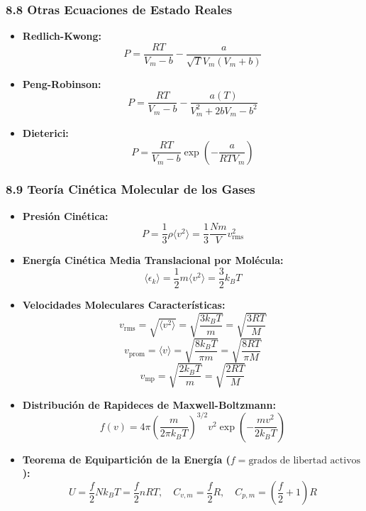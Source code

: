 \documentclass[11pt,a4paper]{article}
\begin{document}
\subsubsection*{8.8 Otras Ecuaciones de Estado Reales}

\begin{itemize}
  \item \textbf{Redlich-Kwong:}
  \[
    P = \frac{R T}{V_m - b} - \frac{a}{\sqrt{T} V_m (V_m + b)}
  \]
  \item \textbf{Peng-Robinson:}
  \[
    P = \frac{R T}{V_m - b} - \frac{a(T)}{V_m^2 + 2bV_m - b^2}
  \]
  \item \textbf{Dieterici:}
  \[
    P = \frac{R T}{V_m - b} \exp\left( -\frac{a}{R T V_m} \right)
  \]
\end{itemize}

\subsubsection*{8.9 Teoría Cinética Molecular de los Gases}

\begin{itemize}
  \item \textbf{Presión Cinética:}
  \[
    P = \frac{1}{3} \rho \langle v^2 \rangle = \frac{1}{3} \frac{N m}{V} v_{\text{rms}}^2
  \]
  \item \textbf{Energía Cinética Media Translacional por Molécula:}
  \[
    \langle \epsilon_k \rangle = \frac{1}{2} m \langle v^2 \rangle = \frac{3}{2} k_B T
  \]
  \item \textbf{Velocidades Moleculares Características:}
  \[
    v_{\text{rms}} = \sqrt{\langle v^2 \rangle} = \sqrt{\frac{3 k_B T}{m}} = \sqrt{\frac{3 R T}{M}}
  \]
  \[
    v_{\text{prom}} = \langle v \rangle = \sqrt{\frac{8 k_B T}{\pi m}} = \sqrt{\frac{8 R T}{\pi M}}
  \]
  \[
    v_{\text{mp}} = \sqrt{\frac{2 k_B T}{m}} = \sqrt{\frac{2 R T}{M}}
  \]
  \item \textbf{Distribución de Rapideces de Maxwell-Boltzmann:}
  \[
    f(v) = 4\pi \left( \frac{m}{2\pi k_B T} \right)^{3/2} v^2 \exp\left( -\frac{m v^2}{2 k_B T} \right)
  \]
  \item \textbf{Teorema de Equipartición de la Energía ($f = \text{grados de libertad activos}$):}
  \[
    U = \frac{f}{2} N k_B T = \frac{f}{2} n R T, \quad C_{v,m} = \frac{f}{2} R, \quad C_{p,m} = \left(\frac{f}{2} + 1\right) R
  \]
\end{itemize}
\end{document}
